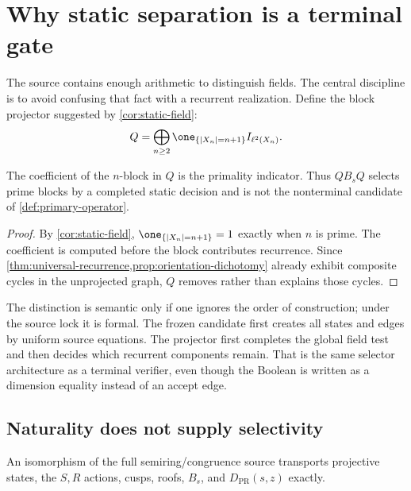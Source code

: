 \section{Why static separation is a terminal gate}
\label{sec:terminal-gate}

The source contains enough arithmetic to distinguish fields.  The central
discipline is to avoid confusing that fact with a recurrent realization.
Define the block projector suggested by \cref{cor:static-field}:
\[
 Q=\bigoplus_{n\ge2}
 \one_{\{|X_n|=n+1\}}I_{\ell^2(X_n)}.
\]

\begin{proposition}
\label{prop:terminal-projector}
The coefficient of the $n$-block in $Q$ is the primality indicator.  Thus
$QB_sQ$ selects prime blocks by a completed static decision and is not the
nonterminal candidate of \cref{def:primary-operator}.
\end{proposition}

\begin{proof}
By \cref{cor:static-field},
$\one_{\{|X_n|=n+1\}}=1$ exactly when $n$ is prime.  The coefficient is
computed before the block contributes recurrence.  Since
\cref{thm:universal-recurrence,prop:orientation-dichotomy} already exhibit
composite cycles in the unprojected graph, $Q$ removes rather than explains
those cycles.
\end{proof}

The distinction is semantic only if one ignores the order of construction;
under the source lock it is formal.  The frozen candidate first creates all
states and edges by uniform source equations.  The projector first completes
the global field test and then decides which recurrent components remain.
That is the same selector architecture as a terminal verifier, even though
the Boolean is written as a dimension equality instead of an accept edge.

\subsection{Naturality does not supply selectivity}

\begin{proposition}
\label{prop:matched-transport}
An isomorphism of the full semiring/congruence source transports projective
states, the $S,R$ actions, cusps, roofs, $B_s$, and $D_{\mathrm{PR}}(s,z)$
exactly.
\end{proposition}

